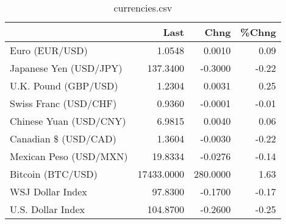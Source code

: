 \documentclass{article}%
\begin{document}
%


\begin{table}[htbp]%
\caption{currencies.csv}%
\centering%
\begin{adjustbox}{width=1\textwidth}%
\begin{tabular}{lrrr}
\toprule
                       &       Last &     Chng &  \%Chng \\
\midrule
        Euro (EUR/USD) &     1.0548 &   0.0010 &   0.09 \\
Japanese Yen (USD/JPY) &   137.3400 &  -0.3000 &  -0.22 \\
  U.K. Pound (GBP/USD) &     1.2304 &   0.0031 &   0.25 \\
 Swiss Franc (USD/CHF) &     0.9360 &  -0.0001 &  -0.01 \\
Chinese Yuan (USD/CNY) &     6.9815 &   0.0040 &   0.06 \\
  Canadian \$ (USD/CAD) &     1.3604 &  -0.0030 &  -0.22 \\
Mexican Peso (USD/MXN) &    19.8334 &  -0.0276 &  -0.14 \\
     Bitcoin (BTC/USD) & 17433.0000 & 280.0000 &   1.63 \\
      WSJ Dollar Index &    97.8300 &  -0.1700 &  -0.17 \\
     U.S. Dollar Index &   104.8700 &  -0.2600 &  -0.25 \\
\bottomrule
\end{tabular}
%
\end{adjustbox}%
\end{table}

%
\end{document}
